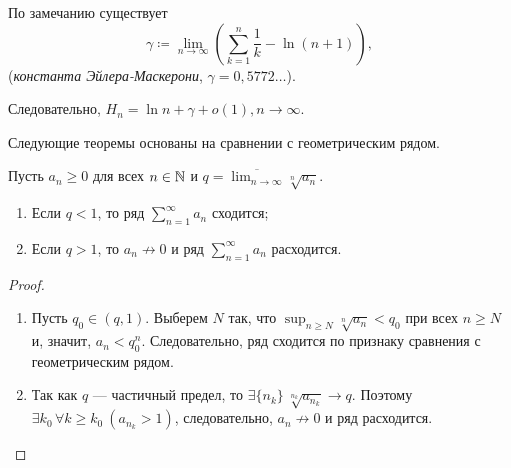 \begin{example}
    По замечанию существует
    \[
        \gamma \coloneqq \lim_{n \rightarrow \infty} \left(\sum_{k = 1}^n \frac{1}{k} - \ln(n + 1)\right),
    \]
    (\emph{константа Эйлера-Маскерони}, $\gamma = 0{,}5772\ldots$).

    Следовательно, $H_n = \ln n + \gamma + o(1), n \rightarrow \infty$.
\end{example}

Следующие теоремы основаны на сравнении с геометрическим рядом.

\begin{theorem}
    \label{cauchy-test}
    Пусть $a_n \ge 0$ для всех $n \in \mathbb{N}$ и $q = \overline{\lim_{n \rightarrow \infty}} \sqrt[n]{a_n}$.

    \begin{enumerate}
        \item Если $q < 1$, то ряд $\sum_{n = 1}^\infty a_n$ сходится;
        \item Если $q > 1$, то $a_n \not\rightarrow 0$ и ряд $\sum_{n = 1}^\infty a_n$ расходится.
    \end{enumerate}

    \begin{proof}
        \begin{enumerate}
            \item Пусть $q_0 \in (q, 1)$. Выберем $N$ так, что $\sup_{n \ge N} \sqrt[n]{a_n} < q_0$ при всех $n \ge N$ и, значит, $a_n < q_0^n$. Следовательно, ряд сходится по признаку сравнения с геометрическим рядом.

            \item Так как $q$ --- частичный предел, то $\exists \{n_k\} \ \sqrt[n_k]{a_{n_k}} \rightarrow q$. Поэтому $\exists k_0 \, \forall k \ge k_0 \ (a_{n_k} > 1)$, следовательно, $a_n \not\rightarrow 0$ и ряд расходится.
        \end{enumerate}
    \end{proof}
\end{theorem}

